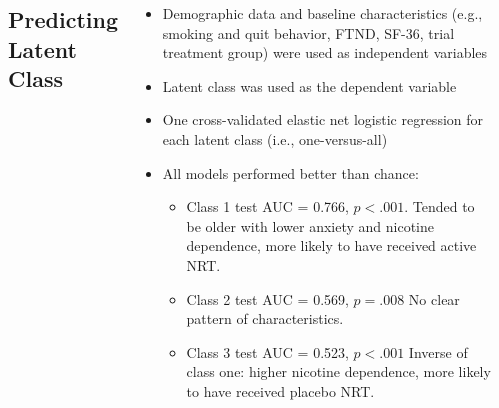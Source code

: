 \documentclass[
	25pt,
	a0paper, 
	portrait,
	blockverticalspace=-3em,
	margin=.5in,
	innermargin=0mm
]{tikzposter}
\begin{document}
{\begin{columns}
\begin{minipage}[]{0.45\linewidth}
			\subsection*{Predicting Latent Class}
			\begin{itemize}
				\item Demographic data and baseline characteristics (e.g., smoking and quit behavior, FTND, SF-36, trial treatment group) were used as independent variables
				\item Latent class was used as the dependent variable
				\item One cross-validated elastic net logistic regression for each latent class (i.e., one-versus-all)
				\item All models performed better than chance:
				\begin{itemize}
					\item Class 1 test AUC = 0.766, $p<.001$. Tended to be older with lower anxiety and nicotine dependence, more likely to have received active NRT.
					\item Class 2 test AUC = 0.569, $p=.008$ No clear pattern of characteristics.
					\item Class 3 test AUC = 0.523, $p<.001$ Inverse of class one: higher nicotine dependence, more likely to have received placebo NRT.
				\end{itemize}
			\end{itemize}
		\end{minipage}
		\begin{minipage}[]{0.5\linewidth}
				\begin{tikzfigure}[]

\end{tikzfigure}
\end{minipage}
\end{columns}}
\end{document}
